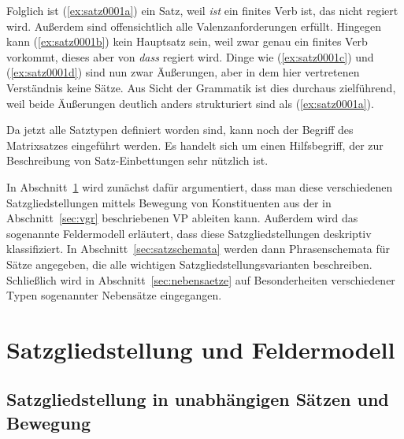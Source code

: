 Folglich ist (\ref{ex:satz0001a}) ein Satz, weil \textit{ist} ein finites Verb ist, das nicht regiert wird.
Außerdem sind offensichtlich alle Valenzanforderungen erfüllt.
Hingegen kann (\ref{ex:satz0001b}) kein Hauptsatz sein, weil zwar genau ein finites Verb vorkommt, dieses aber von \textit{dass} regiert wird.
Dinge wie (\ref{ex:satz0001c}) und (\ref{ex:satz0001d}) sind nun zwar Äußerungen, aber in dem hier vertretenen Verständnis keine Sätze.
Aus Sicht der Grammatik ist dies durchaus zielführend, weil beide Äußerungen deutlich anders strukturiert sind als (\ref{ex:satz0001a}).

\begin{exe}
  \ex\label{ex:satz0001} 
  \begin{xlist}
  \end{xlist}
\end{exe}

Da jetzt alle Satztypen definiert worden sind, kann noch der Begriff des Matrixsatzes eingeführt werden.
Es handelt sich um einen Hilfsbegriff, der zur Beschreibung von Satz-Einbettungen sehr nützlich ist.


In Abschnitt~\ref{sec:felder} wird zunächst dafür argumentiert, dass man diese verschiedenen Satzgliedstellungen mittels Bewegung von Konstituenten aus der in Abschnitt~\ref{sec:vgr} beschriebenen VP ableiten kann.
Außerdem wird das sogenannte Feldermodell erläutert, dass diese Satzgliedstellungen deskriptiv klassifiziert.
In Abschnitt~\ref{sec:satzschemata} werden dann Phrasenschemata für Sätze angegeben, die alle wichtigen Satzgliedstellungsvarianten beschreiben.
Schließlich wird in Abschnitt~\ref{sec:nebensaetze} auf Besonderheiten verschiedener Typen sogenannter Nebensätze eingegangen.

\section{Satzgliedstellung und Feldermodell}

\label{sec:felder}

\subsection{Satzgliedstellung in unabhängigen Sätzen und Bewegung}

